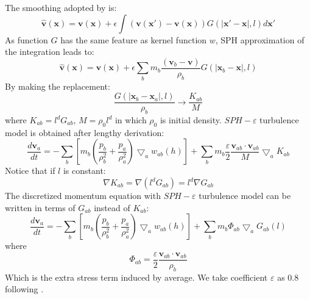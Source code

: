 \documentclass[gmd, manuscript]{copernicus}
\begin{document}
The smoothing adopted by \citet{monaghan2011turbulence}  is:
\begin{equation}
\widehat{\textbf{v}}\left(\textbf{x}\right)=\textbf{v}\left(\textbf{x}\right)+ \epsilon \int \left(\textbf{v}\left(\textbf{x} \prime\right)-\textbf{v}\left(\textbf{x}\right)\right)G\left(\vert \textbf{x} \prime - \textbf{x} \vert, l\right) d\textbf{x} \prime
\end{equation}
As function $G$ has the same feature as kernel function $w$, SPH approximation of the integration leads to:
\begin{equation} \label{eq:SPH-epsilon-filtering}
\widehat{\textbf{v}}\left(\textbf{x}\right)=\textbf{v}\left(\textbf{x}\right)+\epsilon \sum_b m_b \dfrac{\left(\textbf{v}_b -\textbf{v}\right)}{\rho _b} G\left(\vert \textbf{x} _b - \textbf{x} \vert, l\right)
\end{equation}
By making the replacement:
\begin{equation}
\label{eq:replacement-in-turb-derive}
\dfrac{G\left(\vert \textbf{x} _b - \textbf{x} _a \vert, l\right)}{\rho _b} \rightarrow \dfrac{K_{ab}}{M}
\end{equation}
where $K_{ab} = l^d G_{ab}$, $M = \rho_0 l^d$ in which $\rho_0$ is initial density. $SPH-\varepsilon$ turbulence model is obtained after lengthy derivation:
\begin{equation}
\label{eq:monaghan-mom-turb}
\dfrac{d \textbf{v}_a}{dt} = -\sum_b \left[ m_b \left(\dfrac{p_b}{\rho_b^2} + \dfrac{p_a}{\rho_a^2}\right) \bigtriangledown_aw_{a b}\left(h\right)\right] + \sum_b m_b \dfrac{\varepsilon}{2} \dfrac{\textbf{v}_{ab} \cdot \textbf{v}_{ab}}{M} \bigtriangledown_a K_{ab}
\end{equation}
Notice that if $l$ is constant: 
%
%
\begin{equation}
\nabla K_{ab} = \nabla \left(l^d G_{ab}\right) = l^d \nabla G_{ab}
\end{equation}
The discretized momentum equation with $SPH-\varepsilon$ turbulence model can be written in terms of $G_{ab}$ instead of $K_{ab}$:
\begin{equation}
\label{eq:SPH-mom-epsilon-turb}
\dfrac{d \textbf{v}_a}{dt} = -\sum_b \left[m_b \left(\dfrac{p_b}{\rho_b^2} + \dfrac{p_a}{\rho_a^2}\right) \bigtriangledown_aw_{a b}\left(h\right)\right] + \sum_b m_b \Phi_{ab}\bigtriangledown_aG_{ab}\left(l\right)
\end{equation}
where 
\begin{equation}
\Phi_{ab}=\dfrac{\varepsilon}{2} \dfrac{\textbf{v}_{ab} \cdot \textbf{v}_{ab}}{\rho_b} 
\end{equation}
Which is the extra stress term induced by average. We take coefficient $\varepsilon$ as 0.8 following \citet{monaghan2011turbulence}.
\end{document}
